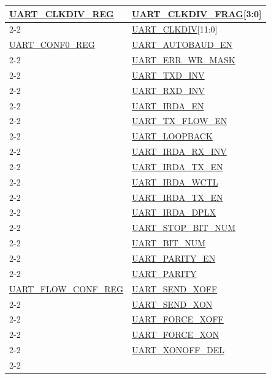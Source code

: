 \documentclass[main\_\_EN.tex]{subfiles}
\begin{document}
\begin{longtable}[c]{|p{6cm}|p{6cm}|}
\hyperref[regdesc:UARTCLKDIVREG]{UART\_CLKDIV\_REG} & \hyperref[fielddesc:UARTCLKDIVFRAG]{UART\_CLKDIV\_FRAG}[3:0] \\\cline{2-2}
 & \hyperref[fielddesc:UARTCLKDIV]{UART\_CLKDIV}[11:0] \\\hline
\hyperref[regdesc:UARTCONF0REG]{UART\_CONF0\_REG}  & \hyperref[fielddesc:UARTAUTOBAUDEN]{UART\_AUTOBAUD\_EN} \\\cline{2-2} 
 & \hyperref[fielddesc:UARTERRWRMASK]{UART\_ERR\_WR\_MASK} \\\cline{2-2} 
 & \hyperref[fielddesc:UARTTXDINV]{UART\_TXD\_INV} \\\cline{2-2} 
 & \hyperref[fielddesc:UARTRXDINV]{UART\_RXD\_INV} \\\cline{2-2} 
 & \hyperref[fielddesc:UARTIRDAEN]{UART\_IRDA\_EN} \\\cline{2-2} 
 & \hyperref[fielddesc:UARTTXFLOWEN]{UART\_TX\_FLOW\_EN} \\\cline{2-2} 
 & \hyperref[fielddesc:UARTLOOPBACK]{UART\_LOOPBACK} \\\cline{2-2} 
 & \hyperref[fielddesc:UARTIRDARXINV]{UART\_IRDA\_RX\_INV} \\\cline{2-2} 
 & \hyperref[fielddesc:UARTIRDATXEN]{UART\_IRDA\_TX\_EN} \\\cline{2-2} 
 & \hyperref[fielddesc:UARTIRDAWCTL]{UART\_IRDA\_WCTL} \\\cline{2-2} 
 & \hyperref[fielddesc:UARTIRDATXEN]{UART\_IRDA\_TX\_EN} \\\cline{2-2} 
 & \hyperref[fielddesc:UARTIRDADPLX]{UART\_IRDA\_DPLX} \\\cline{2-2} 
 & \hyperref[fielddesc:UARTSTOPBITNUM]{UART\_STOP\_BIT\_NUM} \\\cline{2-2} 
 & \hyperref[fielddesc:UARTBITNUM]{UART\_BIT\_NUM} \\\cline{2-2} 
 & \hyperref[fielddesc:UARTPARITYEN]{UART\_PARITY\_EN} \\\cline{2-2} 
 & \hyperref[fielddesc:UARTPARITY]{UART\_PARITY} \\\hline
\hyperref[regdesc:UARTFLOWCONFREG]{UART\_FLOW\_CONF\_REG}  & \hyperref[fielddesc:UARTSENDXOFF]{UART\_SEND\_XOFF} \\\cline{2-2} 
 & \hyperref[fielddesc:UARTSENDXON]{UART\_SEND\_XON} \\\cline{2-2} 
 & \hyperref[fielddesc:UARTFORCEXOFF]{UART\_FORCE\_XOFF} \\\cline{2-2} 
 & \hyperref[fielddesc:UARTFORCEXON]{UART\_FORCE\_XON} \\\cline{2-2} 
 & \hyperref[fielddesc:UARTXONOFFDEL]{UART\_XONOFF\_DEL} \\\cline{2-2} 

\end{longtable}
\end{document}
